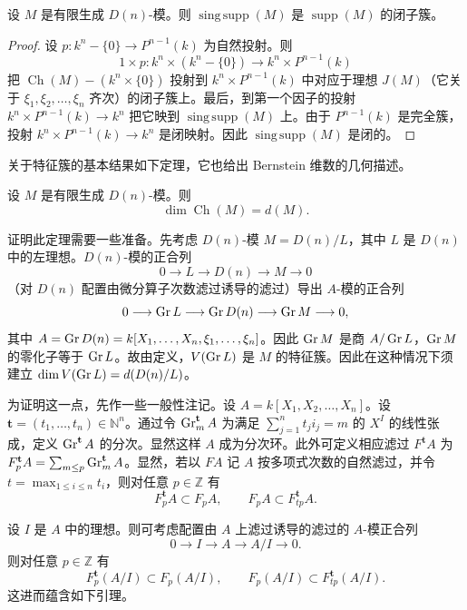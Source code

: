 \begin{lemma}
设 $M$ 是有限生成 $D(n)$-模。则 $\operatorname{sing\,supp}(M)$ 是 $\operatorname{supp}(M)$ 的闭子簇。
\end{lemma}

\begin{proof}
设 $p:k^n-\{0\}\longrightarrow P^{n-1}(k)$ 为自然投射。则
$$1\times p:k^n\times(k^n-\{0\})\longrightarrow k^n\times P^{n-1}(k)$$
把 $\operatorname{Ch}(M)-(k^n\times\{0\})$ 投射到 $k^n\times P^{n-1}(k)$ 中对应于理想 $J(M)$（它关于 $\xi_1,\xi_2,\dots,\xi_n$ 齐次）的闭子簇上。最后，到第一个因子的投射 $k^n\times P^{n-1}(k)\longrightarrow k^n$ 把它映到 $\operatorname{sing\,supp}(M)$ 上。由于 $P^{n-1}(k)$ 是完全簇，投射 $k^n\times P^{n-1}(k)\longrightarrow k^n$ 是闭映射。因此 $\operatorname{sing\,supp}(M)$ 是闭的。
\end{proof}

关于特征簇的基本结果如下定理，它也给出 Bernstein 维数的几何描述。

\begin{theorem}
设 $M$ 是有限生成 $D(n)$-模。则
$$\dim\operatorname{Ch}(M)=d(M).$$
\end{theorem}

证明此定理需要一些准备。先考虑 $D(n)$-模 $M=D(n)/L$，其中 $L$ 是 $D(n)$ 中的左理想。$D(n)$-模的正合列
$$0\longrightarrow L\longrightarrow D(n)\longrightarrow M\longrightarrow 0$$
（对 $D(n)$ 配置由微分算子次数滤过诱导的滤过）导出 $A$-模的正合列
$$0\longrightarrow\operatorname{Gr} L\longrightarrow\operatorname{Gr} D(n)\longrightarrow\operatorname{Gr} M\longrightarrow 0,$$
其中 $A=\operatorname{Gr} D(n)=k[X_1,\dots,X_n,\xi_1,\dots,\xi_n]$。因此 $\operatorname{Gr} M$ 是商 $A/\operatorname{Gr} L$，$\operatorname{Gr} M$ 的零化子等于 $\operatorname{Gr} L$。故由定义，$V(\operatorname{Gr} L)$ 是 $M$ 的特征簇。因此在这种情况下须建立 $\dim V(\operatorname{Gr} L)=d(D(n)/L)$。

为证明这一点，先作一些一般性注记。设 $A=k[X_1,X_2,\dots,X_n]$。设 $\mathbf{t}=(t_1,\dots,t_n)\in\mathbb{N}^n$。通过令 $\operatorname{Gr}^{\mathbf{t}}_m A$ 为满足 $\sum_{j=1}^n t_j i_j=m$ 的 $X^I$ 的线性张成，定义 $\operatorname{Gr}^{\mathbf{t}} A$ 的分次。显然这样 $A$ 成为分次环。此外可定义相应滤过 $F^{\mathbf{t}}A$ 为 $F^{\mathbf{t}}_p A=\sum_{m\le p}\operatorname{Gr}^{\mathbf{t}}_m A$。显然，若以 $F A$ 记 $A$ 按多项式次数的自然滤过，并令 $t=\max_{1\le i\le n}t_i$，则对任意 $p\in\mathbb{Z}$ 有
$$F^{\mathbf{t}}_p A\subset F_p A,\qquad F_p A\subset F^{\mathbf{t}}_{tp}A.$$

设 $I$ 是 $A$ 中的理想。则可考虑配置由 $A$ 上滤过诱导的滤过的 $A$-模正合列
$$0\longrightarrow I\longrightarrow A\longrightarrow A/I\longrightarrow 0.$$
则对任意 $p\in\mathbb{Z}$ 有
$$F^{\mathbf{t}}_p(A/I)\subset F_p(A/I),\qquad F_p(A/I)\subset F^{\mathbf{t}}_{tp}(A/I).$$
这进而蕴含如下引理。

